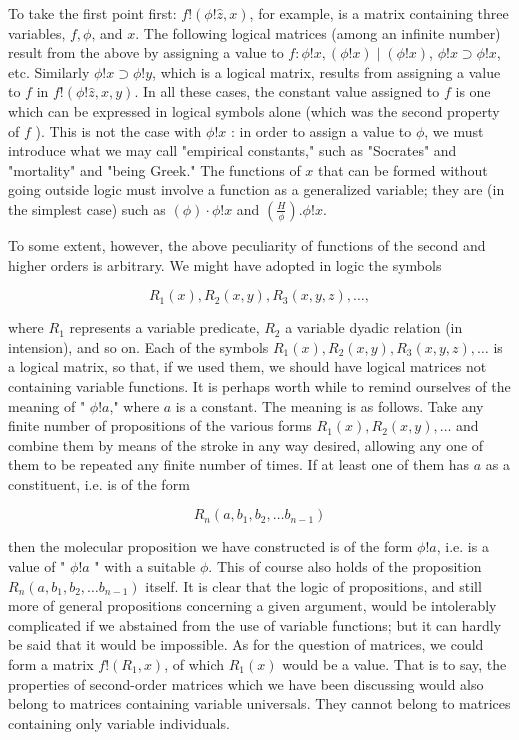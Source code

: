 \documentclass[10pt]{article}
\begin{document}
To take the first point first: $f!(\phi!\hat{z}, x)$, for example, is a matrix containing three variables, $f, \phi$, and $x$. The following logical matrices (among an infinite number) result from the above by assigning a value to $f: \phi!x,(\phi!x) \mid(\phi!x)$, $\phi!x \supset \phi!x$, etc. Similarly $\phi!x \supset \phi!y$, which is a logical matrix, results from assigning a value to $f$ in $f!(\phi!\hat{z}, x, y)$. In all these cases, the constant value assigned to $f$ is one which can be expressed in logical symbols alone (which was the second property of $f$ ). This is not the case with $\phi!x$ : in order to assign a value to $\phi$, we must introduce what we may call "empirical constants," such as "Socrates" and "mortality" and "being Greek." The functions of $x$ that can be formed without going outside logic must involve a function as a generalized variable; they are (in the simplest case) such as $(\phi) \cdot \phi!x$ and $\left(\frac{H}{\phi}\right) . \phi!x$.

To some extent, however, the above peculiarity of functions of the second and higher orders is arbitrary. We might have adopted in logic the symbols

$$
R_{1}(x), R_{2}(x, y), R_{3}(x, y, z), \ldots,
$$

where $R_{1}$ represents a variable predicate, $R_{2}$ a variable dyadic relation (in intension), and so on. Each of the symbols $R_{1}(x), R_{2}(x, y), R_{3}(x, y, z), \ldots$ is a logical matrix, so that, if we used them, we should have logical matrices not containing variable functions. It is perhaps worth while to remind ourselves of the meaning of " $\phi!a$," where $a$ is a constant. The meaning is as follows. Take any finite number of propositions of the various forms $R_{1}(x), R_{2}(x, y), \ldots$ and combine them by means of the stroke in any way desired, allowing any one of them to be repeated any finite number of times. If at least one of them has $a$ as a constituent, i.e. is of the form

$$
R_{n}\left(a, b_{1}, b_{2}, \ldots b_{n-1}\right)
$$

then the molecular proposition we have constructed is of the form $\phi!a$, i.e. is a value of " $\phi!a$ " with a suitable $\phi$. This of course also holds of the proposition $R_{n}\left(a, b_{1}, b_{2}, \ldots b_{n-1}\right)$ itself. It is clear that the logic of propositions, and still more of general propositions concerning a given argument, would be intolerably complicated if we abstained from the use of variable functions; but it can hardly be said that it would be impossible. As for the question of matrices, we could form a matrix $f!\left(R_{1}, x\right)$, of which $R_{1}(x)$ would be a value. That is to say, the properties of second-order matrices which we have been discussing would also belong to matrices containing variable universals. They cannot belong to matrices containing only variable individuals.
\end{document}
